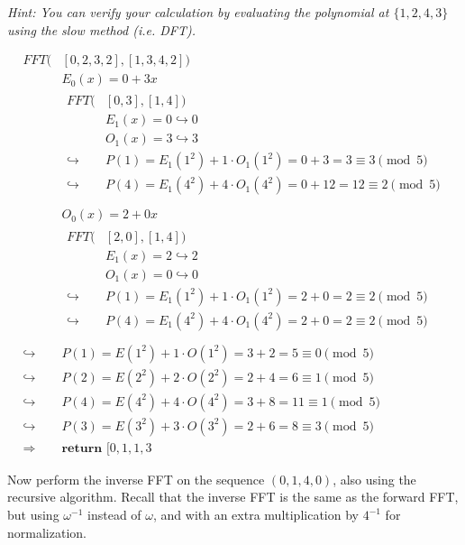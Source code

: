 \documentclass[11pt]{article}
\begin{document}
\begin{subparts}
\textit{Hint: You can verify your calculation by evaluating the polynomial at $\{1, 2, 4, 3\}$ using the slow method (i.e. DFT).}\\
\begin{solution}
    \begin{align*}
       FFT(&[0, 2, 3, 2], [1, 3, 4, 2])\\
        &E_0(x) = 0 + 3x\\
        &\begin{aligned}
            FFT(&[0, 3], [1, 4])\\
            &E_1(x) = 0 \hookrightarrow 0\\
            &O_1(x) = 3 \hookrightarrow 3\\
            \hookrightarrow &P(1) = E_1(1^2) + 1 \cdot O_1(1^2) = 0 + 3 = 3 \equiv 3 \pmod5\\
            \hookrightarrow &P(4) = E_1(4^2) + 4 \cdot O_1(4^2) = 0 + 12 = 12 \equiv 2 \pmod5\\
        \end{aligned} \\
        &O_0(x) = 2 + 0x\\
        &\begin{aligned}
            FFT(&[2, 0], [1, 4])\\
            &E_1(x) = 2 \hookrightarrow 2\\
            &O_1(x) = 0 \hookrightarrow 0\\
            \hookrightarrow &P(1) = E_1(1^2) + 1 \cdot O_1(1^2) = 2 + 0 = 2 \equiv 2 \pmod5\\
            \hookrightarrow &P(4) = E_1(4^2) + 4 \cdot O_1(4^2) = 2 + 0 = 2 \equiv 2 \pmod5\\
        \end{aligned} \\
        \hookrightarrow &P(1) = E(1^2) + 1 \cdot O(1^2) = 3 + 2 = 5 \equiv 0 \pmod5\\
        \hookrightarrow &P(2) = E(2^2) + 2 \cdot O(2^2) = 2 + 4 = 6 \equiv 1 \pmod5\\
        \hookrightarrow &P(4) = E(4^2) + 4 \cdot O(4^2) = 3 + 8 = 11 \equiv 1 \pmod5\\
        \hookrightarrow &P(3) = E(3^2) + 3 \cdot O(3^2) = 2 + 6 = 8 \equiv 3 \pmod5\\
        \Rightarrow &\textbf{return }\boxed{[0, 1, 1, 3}
    \end{align*}
\end{solution}
\newpage
\subpart Now perform the inverse FFT on the sequence $(0, 1, 4, 0)$, also using the recursive algorithm. Recall that the inverse FFT is the same as the forward FFT, but using $\omega^{-1}$ instead of $\omega$, and with an extra multiplication by $4^{-1}$ for normalization.\\

\end{subparts}
\end{document}
